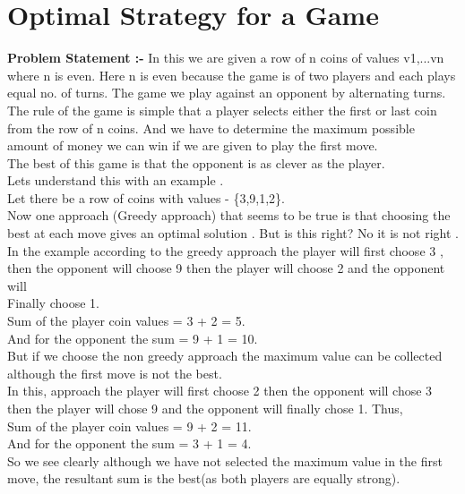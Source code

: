 \documentclass[12pt]{book}
\begin{document}
\chapter{Optimal Strategy for a Game}
\textbf{Problem Statement :-} In this we are given a row of n coins of values v1,...vn where n is even. Here n is even because the game is of two players and each plays equal no. of turns. The game we play against an opponent by alternating turns. The rule of the game is simple that a player selects either the first or last coin from the row of n coins. And we have to determine the maximum possible amount of money we can win if we are given to play the first move.\\
\newline
The best of this game is that the opponent is as clever as the player.\\
\newline
Lets understand this with an example .\\
Let there be a row of coins with values - \{3,9,1,2\}.\\
Now one approach (Greedy approach) that seems to be true is that choosing the best at each move gives an optimal solution . But is this right? No it is not right .\\
\newline
In the example according to the greedy approach the player will first choose 3 , then the opponent will choose 9 then the player will choose 2 and the opponent will\\
Finally choose 1.\\
Sum of the player coin values = 3 + 2 = 5.\\
And for the opponent the sum = 9 + 1 = 10.\\
\newline
But if we choose the non greedy approach the maximum value can be collected although the first move is not the best.\\
\newline
In this, approach the player will first choose 2 then the opponent will chose 3 then the player will chose 9 and the opponent will finally chose 1. Thus,\\
Sum of the player coin values = 9 + 2 = 11.\\
And for the opponent the sum = 3 + 1 = 4.\\
\newline
So we see clearly although we have not selected the maximum value in the first move, the resultant sum is the best(as both players are equally strong).\\
\end{document}
